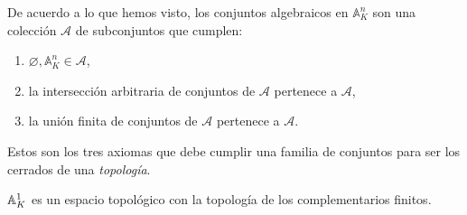 \documentclass[./main.tex]{subfiles}
\begin{document}
De acuerdo a lo que hemos visto, los conjuntos algebraicos en $\mathbb A^n_K$ son una colección $\mathcal A$ de subconjuntos que cumplen:
\begin{enumerate}
    \item $\varnothing, \mathbb A^n_K \in \mathcal A$,
    \item la intersección arbitraria de conjuntos de $\mathcal A$ pertenece a $\mathcal A$,
    \item la unión finita de conjuntos de $\mathcal A$ pertenece a $\mathcal A$.
\end{enumerate}
Estos son los tres axiomas que debe cumplir una familia de conjuntos para ser los cerrados de una \emph{topología}.

\begin{example} $\mathbb{A}_K^1$ es un espacio topológico con la topología de los complementarios finitos.
\end{example}
\end{document}
